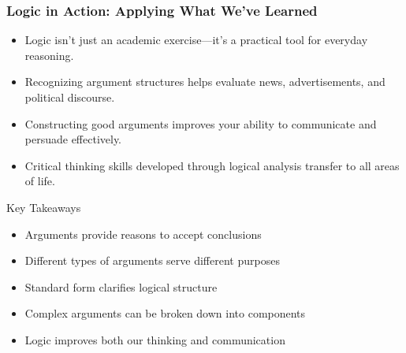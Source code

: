 \documentclass{beamer}
\begin{document}
\begin{frame}
    \frametitle{Logic in Action: Applying What We've Learned}
    \begin{itemize}
        \item Logic isn't just an academic exercise—it's a practical tool for everyday reasoning.
        \item Recognizing argument structures helps evaluate news, advertisements, and political discourse.
        \item Constructing good arguments improves your ability to communicate and persuade effectively.
        \item Critical thinking skills developed through logical analysis transfer to all areas of life.
    \end{itemize}
    
    \begin{block}{Key Takeaways}
        \begin{itemize}
            \item Arguments provide reasons to accept conclusions
            \item Different types of arguments serve different purposes
            \item Standard form clarifies logical structure
            \item Complex arguments can be broken down into components
            \item Logic improves both our thinking and communication
        \end{itemize}
    \end{block}
\end{frame}
\end{document}
